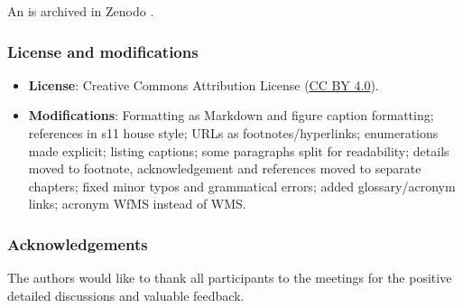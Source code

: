 An  is archived in Zenodo \cite{Leo 2023c}.


\subsubsection*{License and modifications}

\begin{itemize}
\tightlist
\item
  \textbf{License}: Creative Commons Attribution License
  (\href{https://spdx.org/licenses/CC-BY-4.0}{CC BY 4.0}).
\item
  \textbf{Modifications}: Formatting as Markdown and figure caption formatting; references in s11 house style; URLs as footnotes/hyperlinks; enumerations made explicit; listing captions; some paragraphs split for readability; details moved to footnote, acknowledgement and references moved to separate chapters; fixed minor typos and grammatical errors; added glossary/acronym links; acronym WfMS instead of WMS.
\end{itemize}


\subsubsection*{Acknowledgements}

The authors would like to thank all participants to the 
meetings for the positive detailed discussions and
valuable feedback.

